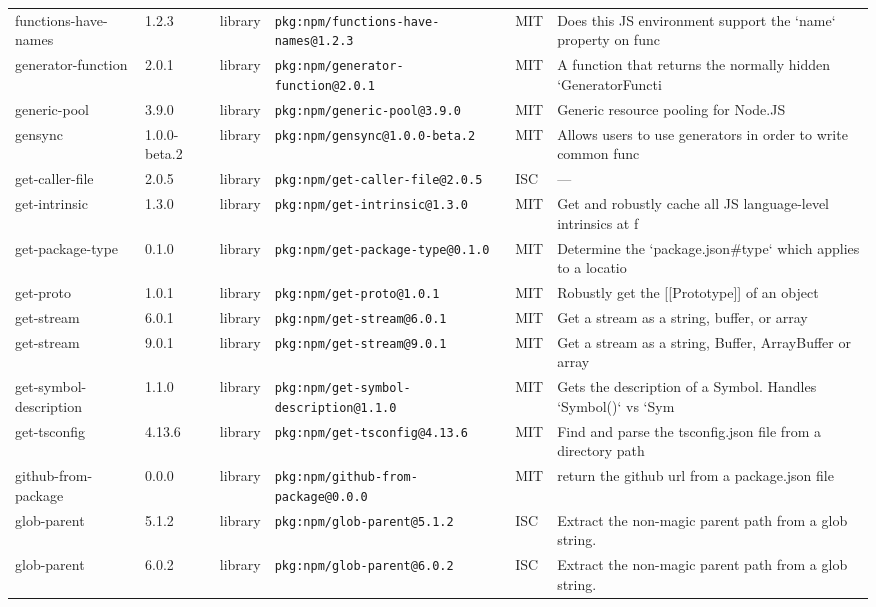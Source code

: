 \documentclass[11pt]{article}
\begin{document}
\begin{longtable}{|l|l|l|p{2.2cm}|l|p{4cm}|}
functions-have-names & 1.2.3 & library & \texttt{pkg:npm/functions-have-names@1.2.3} & MIT & Does this JS environment support the `name` property on func \\
generator-function & 2.0.1 & library & \texttt{pkg:npm/generator-function@2.0.1} & MIT & A function that returns the normally hidden `GeneratorFuncti \\
generic-pool & 3.9.0 & library & \texttt{pkg:npm/generic-pool@3.9.0} & MIT & Generic resource pooling for Node.JS \\
gensync & 1.0.0-beta.2 & library & \texttt{pkg:npm/gensync@1.0.0-beta.2} & MIT & Allows users to use generators in order to write common func \\
get-caller-file & 2.0.5 & library & \texttt{pkg:npm/get-caller-file@2.0.5} & ISC & — \\
get-intrinsic & 1.3.0 & library & \texttt{pkg:npm/get-intrinsic@1.3.0} & MIT & Get and robustly cache all JS language-level intrinsics at f \\
get-package-type & 0.1.0 & library & \texttt{pkg:npm/get-package-type@0.1.0} & MIT & Determine the `package.json\#type` which applies to a locatio \\
get-proto & 1.0.1 & library & \texttt{pkg:npm/get-proto@1.0.1} & MIT & Robustly get the [[Prototype]] of an object \\
get-stream & 6.0.1 & library & \texttt{pkg:npm/get-stream@6.0.1} & MIT & Get a stream as a string, buffer, or array \\
get-stream & 9.0.1 & library & \texttt{pkg:npm/get-stream@9.0.1} & MIT & Get a stream as a string, Buffer, ArrayBuffer or array \\
get-symbol-description & 1.1.0 & library & \texttt{pkg:npm/get-symbol-description@1.1.0} & MIT & Gets the description of a Symbol. Handles `Symbol()` vs `Sym \\
get-tsconfig & 4.13.6 & library & \texttt{pkg:npm/get-tsconfig@4.13.6} & MIT & Find and parse the tsconfig.json file from a directory path \\
github-from-package & 0.0.0 & library & \texttt{pkg:npm/github-from-package@0.0.0} & MIT & return the github url from a package.json file \\
glob-parent & 5.1.2 & library & \texttt{pkg:npm/glob-parent@5.1.2} & ISC & Extract the non-magic parent path from a glob string. \\
glob-parent & 6.0.2 & library & \texttt{pkg:npm/glob-parent@6.0.2} & ISC & Extract the non-magic parent path from a glob string. \\

\end{longtable}
\end{document}
